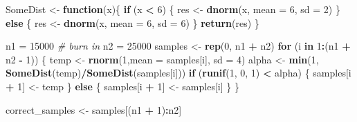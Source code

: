 \documentclass[]{article}
\newenvironment{Shaded}{\begin{snugshade}}{\end{snugshade}}
\newcommand{\KeywordTok}[1]{\textcolor[rgb]{0.13,0.29,0.53}{\textbf{#1}}}
\newcommand{\DataTypeTok}[1]{\textcolor[rgb]{0.13,0.29,0.53}{#1}}
\newcommand{\DecValTok}[1]{\textcolor[rgb]{0.00,0.00,0.81}{#1}}
\newcommand{\StringTok}[1]{\textcolor[rgb]{0.31,0.60,0.02}{#1}}
\newcommand{\CommentTok}[1]{\textcolor[rgb]{0.56,0.35,0.01}{\textit{#1}}}
\newcommand{\ControlFlowTok}[1]{\textcolor[rgb]{0.13,0.29,0.53}{\textbf{#1}}}
\newcommand{\OperatorTok}[1]{\textcolor[rgb]{0.81,0.36,0.00}{\textbf{#1}}}
\newcommand{\NormalTok}[1]{#1}
\begin{document}
\begin{Shaded}
\begin{Highlighting}[]
\NormalTok{SomeDist <-}\StringTok{ }\ControlFlowTok{function}\NormalTok{(x)\{}
  \ControlFlowTok{if}\NormalTok{ (x }\OperatorTok{<}\StringTok{ }\DecValTok{6}\NormalTok{) \{}
\NormalTok{    res <-}\StringTok{ }\KeywordTok{dnorm}\NormalTok{(x, }\DataTypeTok{mean =} \DecValTok{6}\NormalTok{, }\DataTypeTok{sd =} \DecValTok{2}\NormalTok{)}
\NormalTok{  \} }\ControlFlowTok{else}\NormalTok{ \{}
\NormalTok{    res <-}\StringTok{ }\KeywordTok{dnorm}\NormalTok{(x, }\DataTypeTok{mean =} \DecValTok{6}\NormalTok{, }\DataTypeTok{sd =} \DecValTok{6}\NormalTok{)}
\NormalTok{  \}}
  \KeywordTok{return}\NormalTok{(res)}
\NormalTok{\}}
 
\NormalTok{n1 =}\StringTok{ }\DecValTok{15000}  \CommentTok{# burn in}
\NormalTok{n2 =}\StringTok{ }\DecValTok{25000}
\NormalTok{samples <-}\StringTok{ }\KeywordTok{rep}\NormalTok{(}\DecValTok{0}\NormalTok{, n1 }\OperatorTok{+}\StringTok{ }\NormalTok{n2)}
\ControlFlowTok{for}\NormalTok{ (i }\ControlFlowTok{in} \DecValTok{1}\OperatorTok{:}\NormalTok{(n1 }\OperatorTok{+}\StringTok{ }\NormalTok{n2 }\OperatorTok{-}\StringTok{ }\DecValTok{1}\NormalTok{)) \{}
\NormalTok{  temp <-}\StringTok{ }\KeywordTok{rnorm}\NormalTok{(}\DecValTok{1}\NormalTok{,}\DataTypeTok{mean =}\NormalTok{ samples[i], }\DataTypeTok{sd =} \DecValTok{4}\NormalTok{)}
\NormalTok{  alpha <-}\StringTok{ }\KeywordTok{min}\NormalTok{(}\DecValTok{1}\NormalTok{, }\KeywordTok{SomeDist}\NormalTok{(temp)}\OperatorTok{/}\KeywordTok{SomeDist}\NormalTok{(samples[i]))}
  \ControlFlowTok{if}\NormalTok{ (}\KeywordTok{runif}\NormalTok{(}\DecValTok{1}\NormalTok{, }\DecValTok{0}\NormalTok{, }\DecValTok{1}\NormalTok{) }\OperatorTok{<}\StringTok{ }\NormalTok{alpha) \{}
\NormalTok{    samples[i }\OperatorTok{+}\StringTok{ }\DecValTok{1}\NormalTok{] <-}\StringTok{ }\NormalTok{temp}
\NormalTok{  \} }\ControlFlowTok{else}\NormalTok{ \{}
\NormalTok{    samples[i }\OperatorTok{+}\StringTok{ }\DecValTok{1}\NormalTok{] <-}\StringTok{ }\NormalTok{samples[i]}
\NormalTok{  \}}
\NormalTok{\}}

\NormalTok{correct_samples <-}\StringTok{ }\NormalTok{samples[(n1 }\OperatorTok{+}\StringTok{ }\DecValTok{1}\NormalTok{)}\OperatorTok{:}\NormalTok{n2]}
\end{Highlighting}
\end{Shaded}
\end{document}
